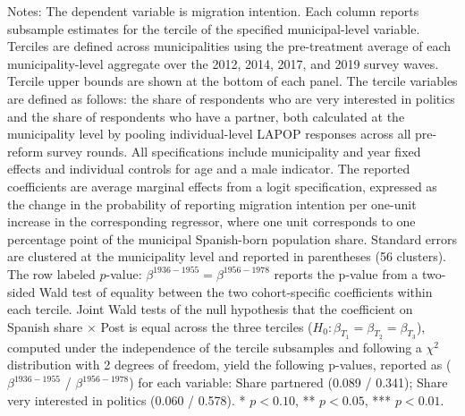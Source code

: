\begin{table}[!h]
\caption*{\footnotesize Notes: The dependent variable is migration intention. Each column reports subsample estimates for the tercile of the specified municipal-level variable. Terciles are defined across municipalities using the pre-treatment average of each municipality-level aggregate over the 2012, 2014, 2017, and 2019 survey waves. Tercile upper bounds are shown at the bottom of each panel. The tercile variables are defined as follows: the share of respondents who are very interested in politics and the share of respondents who have a partner, both calculated at the municipality level by pooling individual-level LAPOP responses across all pre-reform survey rounds. All specifications include municipality and year fixed effects and individual controls for age and a male indicator. The reported coefficients are average marginal effects from a logit specification, expressed as the change in the probability of reporting migration intention per one-unit increase in the corresponding regressor, where one unit corresponds to one percentage point of the municipal Spanish-born population share. Standard errors are clustered at the municipality level and reported in parentheses (56 clusters). The row labeled $p$-value: $\beta^{1936-1955}=\beta^{1956-1978}$ reports the p-value from a two-sided Wald test of equality between the two cohort-specific coefficients within each tercile. Joint Wald tests of the null hypothesis that the coefficient on Spanish share $\times$ Post is equal across the three terciles ($H_0: \beta_{T_1} = \beta_{T_2} = \beta_{T_3}$), computed under the independence of the tercile subsamples and following a $\chi^2$ distribution with 2 degrees of freedom, yield the following p-values, reported as ($\beta^{1936-1955}$ / $\beta^{1956-1978}$) for each variable: Share partnered (0.089 / 0.341); Share very interested in politics (0.060 / 0.578). * $p<0.10$, ** $p<0.05$, *** $p<0.01$.}
\end{table}
